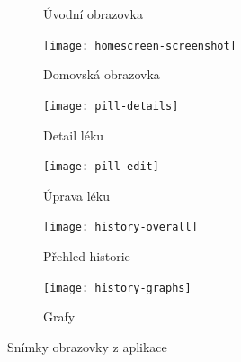 \documentclass[../TakeYourPill.tex]{subfiles}
\begin{document}
\begin{figure}[ht]
\begin{subfigure}[b]{.3\textwidth}
    \caption{Úvodní obrazovka}
    \label{fig:intro}
  \end{subfigure}
  \hfill
  \begin{subfigure}[b]{.3\textwidth}
    \centering
    \texttt{[image: homescreen-screenshot]}
    \caption{Domovská obrazovka}
    \label{fig:homescreen}
  \end{subfigure}
  \hfill
  \begin{subfigure}[b]{.3\textwidth}
    \centering
    \texttt{[image: pill-details]}
    \caption{Detail léku}
    \label{fig:details}
  \end{subfigure}
  \hfill
  \vfill
  \vspace{6pt}
  \hfill
  \begin{subfigure}[b]{.3\textwidth}
    \centering
    \texttt{[image: pill-edit]}
    \caption{Úprava léku}
    \label{fig:edit}
  \end{subfigure}
  \hfill
  \begin{subfigure}[b]{.3\textwidth}
    \centering
    \texttt{[image: history-overall]}
    \caption{Přehled historie}
    \label{fig:history}
  \end{subfigure}
  \hfill
  \begin{subfigure}[b]{.3\textwidth}
    \centering
    \texttt{[image: history-graphs]}
    \caption{Grafy}
    \label{fig:graphs}
  \end{subfigure}
  \hfill
  \vfill
\caption{Snímky obrazovky z  aplikace}
\label{fig:screenshots}
\end{figure}
\end{document}
